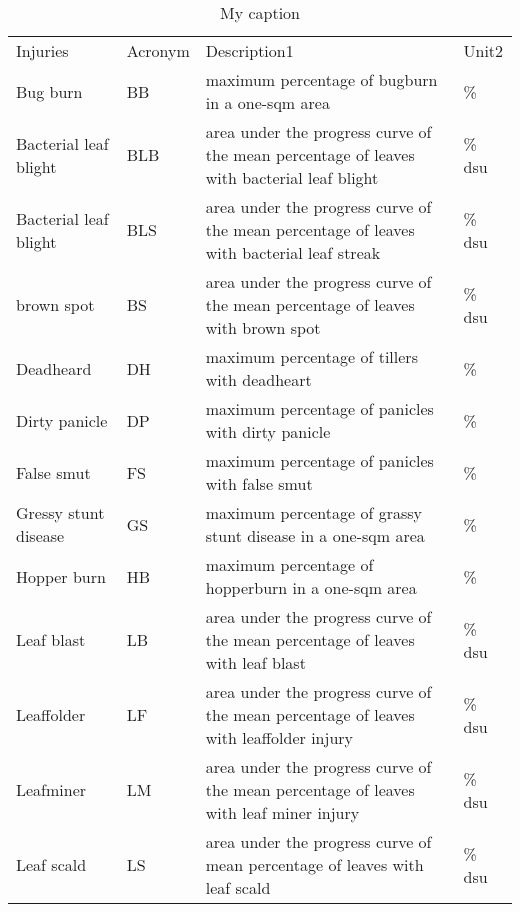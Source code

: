 \begin{table}[]
\centering
\caption{My caption}
\label{my-label}
\begin{tabular}{llll}
Injuries              & Acronym & Description1                                                                              & Unit2  \\
Bug burn              & BB      & maximum percentage of bugburn in a one-sqm area                                           & \%     \\
Bacterial leaf blight & BLB     & area under the progress curve of the mean percentage of leaves with bacterial leaf blight & \% dsu \\
Bacterial leaf blight & BLS     & area under the progress curve of the mean percentage of leaves with bacterial leaf streak & \% dsu \\
brown spot            & BS      & area under the progress curve of the mean percentage of leaves with brown spot            & \% dsu \\
Deadheard             & DH      & maximum percentage of tillers with deadheart                                              & \%     \\
Dirty panicle         & DP      & maximum percentage of panicles with dirty panicle                                         & \%     \\
False smut            & FS      & maximum percentage of panicles with false smut                                            & \%     \\
Gressy stunt disease  & GS      & maximum percentage of grassy stunt disease in a one-sqm area                              & \%     \\
Hopper burn           & HB      & maximum percentage of hopperburn in a one-sqm area                                        & \%     \\
Leaf blast            & LB      & area under the progress curve of the mean percentage of leaves with leaf blast            & \% dsu \\
Leaffolder            & LF      & area under the progress curve of the mean percentage of leaves with leaffolder injury     & \% dsu \\
Leafminer             & LM      & area under the progress curve of the mean percentage of leaves with leaf miner injury     & \% dsu \\
Leaf scald            & LS      & area under the progress curve of mean percentage of leaves with leaf scald                & \% dsu \\

\end{tabular}
\end{table}
